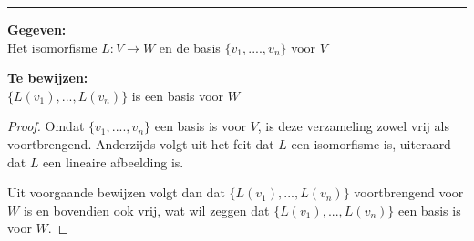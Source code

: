 \documentclass{article}
\begin{document}
	
	
	\rule{1cm}{0.01mm}
	
	\textbf{Gegeven:}\\
	Het isomorfisme \(L: V \to W\) en de basis \( \{ v_1,....,v_n \} \) voor \(V\)
	
	\textbf{Te bewijzen:}\\
	\( \{ L(v_1),...,L(v_n) \} \) is een basis voor \(W\)
	
	\begin{proof}
		
		Omdat \( \{ v_1,....,v_n \} \) een basis is voor \(V\), is deze verzameling zowel vrij als voortbrengend. Anderzijds volgt uit het feit dat \(L\) een isomorfisme is, uiteraard dat \(L\) een lineaire afbeelding is.
		
		Uit voorgaande bewijzen volgt dan dat \( \{ L(v_1),...,L(v_n) \} \) voortbrengend voor \(W\) is en bovendien ook vrij, wat wil zeggen dat \( \{ L(v_1),...,L(v_n) \} \) een basis is voor \(W\).
		
	\end{proof}
	
\end{document}
